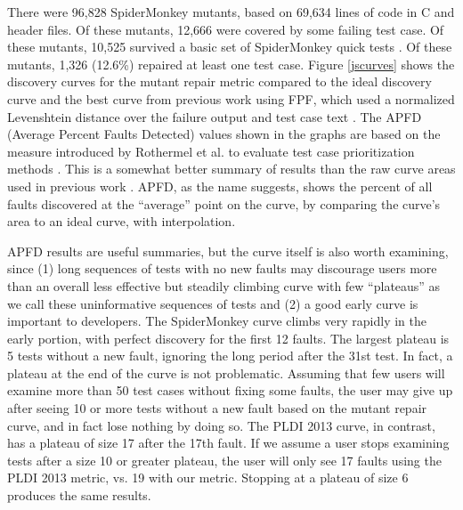 There were 96,828 SpiderMonkey mutants, based on 69,634 lines of code in C and header files.  Of these mutants, 12,666 were covered by some failing test case.  Of these mutants, 10,525 survived a basic set of SpiderMonkey quick tests \cite{icst2014}.  Of these mutants, 1,326 (12.6\%) repaired at least one test case.  Figure \ref{jscurves} shows the discovery curves for the mutant repair metric compared to the ideal discovery curve and the best curve from previous work using FPF, which used a normalized Levenshtein distance \cite{lev} over the failure output and test case text \cite{PLDI13}.  The APFD (Average Percent Faults Detected) values shown in the graphs are based on the measure  introduced by Rothermel et al. to evaluate test case prioritization methods \cite{APFD}.  This is a somewhat better summary of results than the raw curve areas used in previous work \cite{PLDI13}.  APFD, as the name suggests, shows the percent of all faults discovered at the ``average'' point on the curve, by comparing the curve's area to an ideal curve, with interpolation.

APFD results are useful summaries, but the curve itself is also worth examining, since (1) long sequences of tests with no new faults may discourage users more than an overall less effective but steadily climbing curve with few ``plateaus'' as we call these uninformative sequences of tests and (2) a good early curve is important to developers.  The SpiderMonkey curve climbs very rapidly in the early portion, with perfect discovery for the first 12 faults. The largest plateau is 5 tests without a new fault, ignoring the long period after the 31st test.  In fact, a plateau at the end of the curve is not problematic.  Assuming that few users will examine more than 50 test cases without fixing some faults, the user may give up after seeing 10 or more tests without a new fault based on the mutant repair curve, and in fact lose nothing by doing so.  The PLDI 2013 curve, in contrast, has a plateau of size 17 after the 17th fault.  If we assume a user stops examining tests after a size 10 or greater plateau, the user will only see 17 faults using the PLDI 2013 metric, vs. 19 with our metric.  Stopping at a plateau of size 6 produces the same results.

